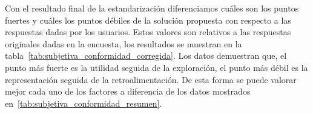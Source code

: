 
Con el resultado final de la estandarización diferenciamos cuáles son los puntos
fuertes y cuáles los puntos débiles de la solución propuesta con respecto a las
respuestas dadas por los usuarios. Estos valores son relativos a las respuestas
originales dadas en la encuesta, los resultados se muestran en la
tabla~\ref{tab:subjetiva_conformidad_corregida}. Los datos demuestran que, el punto 
más fuerte es la utilidad seguida de la exploración, el punto más débil es la representación 
seguida de la retroalimentación. De esta forma se puede valorar mejor cada uno de los factores 
a diferencia de los datos mostrados en~\ref{tab:subjetiva_conformidad_resumen}.

